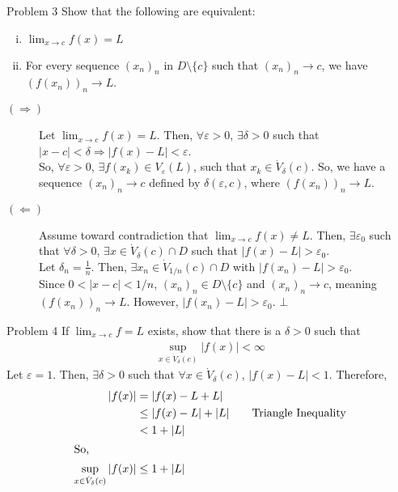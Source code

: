 \documentclass[10pt]{extarticle}
\begin{document}
  \begin{problem}{Problem 3}
    Show that the following are equivalent:
    \begin{enumerate}[(i)]
      \item $\lim_{x\rightarrow c} f(x) = L$
      \item For every sequence $(x_n)_n$ in $D\setminus \{c\}$ such that $(x_n)_n \rightarrow c$, we have $(f(x_n))_n \rightarrow L$. 
    \end{enumerate}
    \tcblower
    \begin{description}
      \item[$(\Rightarrow)$] Let $\lim_{x\rightarrow c} f(x) = L$. Then, $\forall \varepsilon > 0$, $\exists \delta > 0$ such that $|x-c| < \delta \Rightarrow |f(x) - L| < \varepsilon$.\\

        So, $\forall \varepsilon > 0$, $\exists f(x_k) \in V_{\varepsilon}(L)$, such that $x_k\in \dot{V}_{\delta}(c)$. So, we have a sequence $(x_n)_n \rightarrow c$ defined by $\delta(\varepsilon, c)$, where $\left(f(x_n)\right)_n \rightarrow L$.
      \item[$(\Leftarrow)$] Assume toward contradiction that $\lim_{x\rightarrow c} f(x) \neq L$. Then, $\exists \varepsilon_0$ such that $\forall \delta > 0$, $\exists x\in \dot{V}_{\delta}(c) \cap D$ such that $|f(x) - L| > \varepsilon_0$.\\

        Let $\delta_n = \frac{1}{n}$. Then, $\exists x_n\in \dot{V}_{1/n}(c) \cap D$ with $|f(x_n) - L| > \varepsilon_0$.\\

        Since $0 < |x-c| < 1/n$, $(x_n)_n \in D\setminus \{c\}$ and $(x_n)_n \rightarrow c$, meaning $(f(x_n))_n \rightarrow L$. However, $|f(x_n) - L| > \varepsilon_0$. $\bot$
    \end{description}
  \end{problem}
  \begin{problem}{Problem 4}
    If $\lim_{x\rightarrow c} f = L$ exists, show that there is a $\delta > 0$ such that
    \begin{align*}
      \sup_{x\in\dot{V}_{\delta}(c)}|f(x)| < \infty
    \end{align*}
    \tcblower
    Let $\varepsilon = 1$. Then, $\exists \delta > 0$ such that $\forall x\in \dot{V}_{\delta}(c)$, $|f(x) - L| < 1$. Therefore,
    \begin{align*}
      |f(x)| &= |f(x) - L + L|\\
             &\leq |f(x) - L| + |L|\tag*{Triangle Inequality}\\
             &< 1 + |L|\\
             \shortintertext{So,}
      \sup_{x\in \dot{V}_{\delta}(c)}|f(x)| &\leq 1 + |L|
    \end{align*}
  \end{problem}
\end{document}

